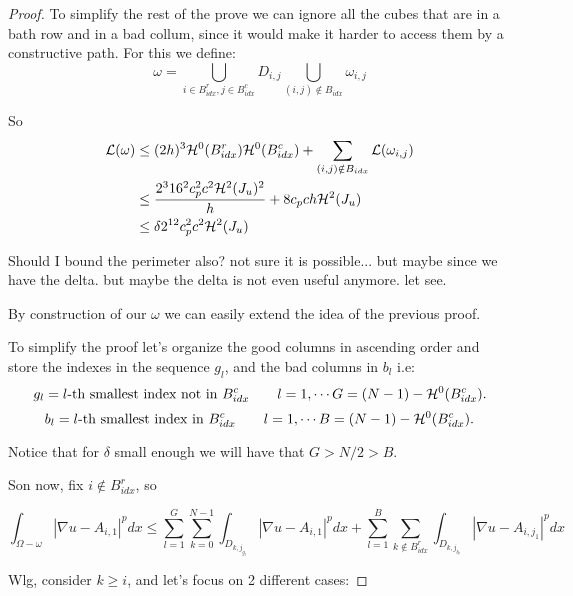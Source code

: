 \begin{proof}
    To simplify the rest of the prove we can ignore all the cubes that are in a 
     bath row and in a bad collum, since it would make it harder to access them by a constructive path. For this we define: $$\omega = \bigcup_{i\in B^r_{idx},j\in B^c_{idx}}D_{i,j} \bigcup_{(i,j)\notin B_{idx}} \omega_{i,j}$$
    
    So 
    \begin{align*}
        {\mathcal L}(\omega)&\leq (2h)^3{\mathcal H}^0(B^r_{idx}){\mathcal H}^0(B^c_{idx})+ \sum_{(i,j)\notin B_{idx}} {\mathcal L}(\omega_{i,j})\\
        &\leq \frac{2^316^2 c_p^2 c^2{\mathcal H}^2(J_u)^2}{h} + 8c_pch{\mathcal H}^2(J_u)\\
        &\leq \delta 2^{12} c_p^2 c^2{\mathcal H}^2(J_u)
    \end{align*}
    \begin{question}
        Should I bound the perimeter also? not sure it is possible... but maybe since we have the delta. but maybe the delta is not even useful anymore. let see.
    \end{question}
    
    By construction of our $\omega$ we can easily extend the idea of the previous proof. 
    
    To simplify the proof let's organize the good columns in ascending order and  store the indexes in the sequence $g_l$, and the bad columns in $b_l$ i.e:
    $$g_l = l\text{-th smallest index not in }  B^c_{idx}\qquad l=1,\cdots G=(N-1)-{\mathcal H}^0(B^c_{idx}).$$
    $$b_l = l\text{-th smallest index in }  B^c_{idx}\qquad l=1,\cdots B=(N-1)-{\mathcal H}^0(B^c_{idx}).$$
    
    Notice that for $\delta$ small enough we will have that $G>N/2>B$.
    
    Son now, fix $i\notin B^r_{idx}$, so
    
    \begin{equation*}
    \int_{\Omega-\omega }|\nabla u- A_{i,1}|^p d x \leq \sum_{l=1}^G\sum_{k=0}^{N-1}\int_{D_{k,j_{g_l}}}|\nabla u- A_{i,1}|^p d x+\sum_{l=1}^B\sum_{k\notin B^r_{idx}}\int_{D_{k,j_{b_l}}}|\nabla u- A_{i,j_1}|^p d x
    \end{equation*}
    
    Wlg, consider $k\geq i$, and let's focus on 2 different cases:
    

\end{proof}
